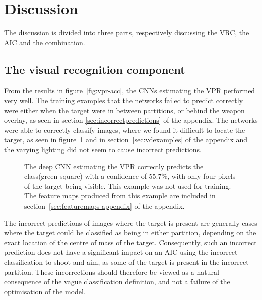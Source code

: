 
\clearpage
\section{Discussion}
\label{sec:discussion}
The discussion is divided into three parts, respectively discussing the VRC, the AIC and the combination.

\subsection{The visual recognition component}
From the results in figure~\ref{fig:vpr-acc}, the CNNs estimating the VPR performed very well. The training examples that the networks failed to predict correctly were either when the target were in between partitions, or behind the weapon overlay, as seen in section \ref{sec:incorrectpredictions} of the appendix. The networks were able to correctly classify images, where we found it difficult to locate the target, as seen in figure~\ref{fig:hardprediction} and in section~\ref{sec:vdexamples} of the appendix and the varying lighting did not seem to cause incorrect predictions.

\begin{figure}[h]
	\begin{scriptsize}
		\sffamily
		\def\svgwidth{\textwidth}
		
	\end{scriptsize}
	\caption[Difficult VPR classification example]{The deep CNN estimating the VPR correctly predicts the class(green square) with a confidence of 55.7\%, with only four pixels of the target being visible. This example was not used for training. The feature maps produced from this example are included in section~\ref{sec:featuremaps-appendix} of the appendix.}
	\label{fig:hardprediction}
\end{figure}

The incorrect predictions of images where the target is present are generally cases where the target could be classified as being in either partition, depending on the exact location of the centre of mass of the target. Consequently, such an incorrect prediction does not have a significant impact on an AIC using the incorrect classification to shoot and aim, as some of the target is present in the incorrect partition. These incorrections should therefore be viewed as a natural consequence of the vague classification definition, and not a failure of the optimisation of the model.


